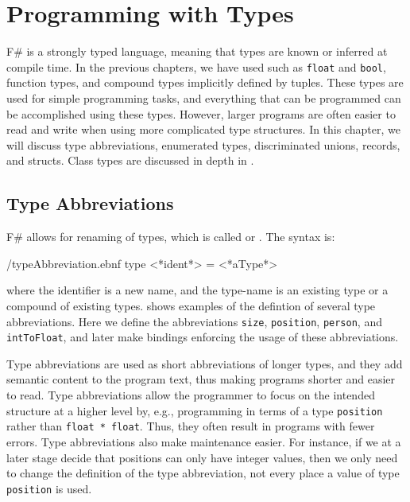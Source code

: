 \chapter{Programming with Types}
\label{chap:type}
F\# is a strongly typed language, meaning that types are known or inferred at compile time. In the previous chapters, we have used  such as \lstinline{float} and \lstinline{bool},  function types, and compound types implicitly defined by tuples. These types are used for simple programming tasks, and everything that can be programmed can be accomplished using these types. However, larger programs are often easier to read and write when using more complicated type structures. In this chapter, we will discuss type abbreviations, enumerated types, discriminated unions, records, and structs. Class types are discussed in depth in .

\section{Type Abbreviations}
\label{sec:typeAbbreviations}
F\# allows for renaming of types, which is called  or . The syntax is:
%
\begin{verbatimwrite}{\ebnf/typeAbbreviation.ebnf}
type <*ident*> = <*aType*>
\end{verbatimwrite}
%
where the identifier is a new name, and the type-name is an existing type or a compound of existing types.  shows examples of the defintion of several type abbreviations.
%
%
Here we define the abbreviations \lstinline{size}, \lstinline{position}, \lstinline{person}, and \lstinline{intToFloat}, and later make bindings enforcing the usage of these abbreviations.

Type abbreviations are used as short abbreviations of longer types, and they add semantic content to the program text, thus making programs shorter and easier to read. Type abbreviations allow the programmer to focus on the intended structure at a higher level by, e.g., programming in terms of a type \lstinline{position} rather than \lstinline{float * float}. Thus, they often result in programs with fewer errors. Type abbreviations also make maintenance easier. For instance, if we at a later stage decide that positions can only have integer values, then we only need to change the definition of the type abbreviation, not every place a value of type \lstinline{position} is used.

